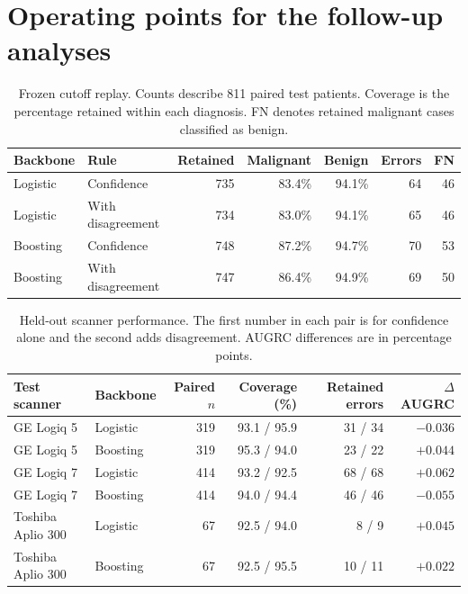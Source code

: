 \documentclass[11pt]{article}
\begin{document}
\section{Operating points for the follow-up analyses}

\begin{table}[H]
\centering
\small
\caption{Frozen cutoff replay. Counts describe 811 paired test patients. Coverage is the percentage retained within each diagnosis. FN denotes retained malignant cases classified as benign.}
\label{tab:frozen}
\begin{tabular}{llrrrrr}
\toprule
Backbone & Rule & Retained & Malignant & Benign & Errors & FN\\
\midrule
Logistic & Confidence & 735 & 83.4\% & 94.1\% & 64 & 46\\
Logistic & With disagreement & 734 & 83.0\% & 94.1\% & 65 & 46\\
Boosting & Confidence & 748 & 87.2\% & 94.7\% & 70 & 53\\
Boosting & With disagreement & 747 & 86.4\% & 94.9\% & 69 & 50\\
\bottomrule
\end{tabular}
\end{table}

\begin{table}[H]
\centering
\small
\caption{Held-out scanner performance. The first number in each pair is for confidence alone and the second adds disagreement. AUGRC differences are in percentage points.}
\label{tab:devices}
\begin{tabular}{llrrrr}
\toprule
Test scanner & Backbone & Paired $n$ & Coverage (\%) & Retained errors & $\Delta$AUGRC\\
\midrule
GE Logiq 5 & Logistic & 319 & 93.1 / 95.9 & 31 / 34 & $-0.036$\\
GE Logiq 5 & Boosting & 319 & 95.3 / 94.0 & 23 / 22 & $+0.044$\\
GE Logiq 7 & Logistic & 414 & 93.2 / 92.5 & 68 / 68 & $+0.062$\\
GE Logiq 7 & Boosting & 414 & 94.0 / 94.4 & 46 / 46 & $-0.055$\\
Toshiba Aplio 300 & Logistic & 67 & 92.5 / 94.0 & 8 / 9 & $+0.045$\\
Toshiba Aplio 300 & Boosting & 67 & 92.5 / 95.5 & 10 / 11 & $+0.022$\\
\bottomrule
\end{tabular}
\end{table}
\end{document}
